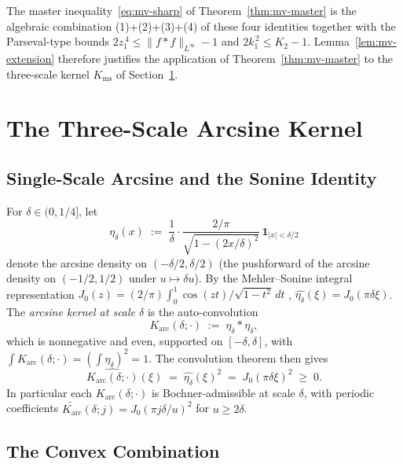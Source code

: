 \documentclass[11pt, letterpaper]{article}
\theoremstyle{paperplain}
\theoremstyle{paperdef}
\newcommand{\Linf}{L^\infty}
\newcommand{\Karc}{K_{\mathrm{arc}}}
\newcommand{\Kms}{K_{\mathrm{ms}}}
\begin{document}
The master inequality~\eqref{eq:mv-sharp} of
Theorem~\ref{thm:mv-master} is the algebraic combination
(1)+(2)+(3)+(4) of these four identities together with the
Parseval-type bounds $2z_1^{\,4}\le\|f*f\|_{\Linf}-1$ and
$2k_1^{\,2}\le K_2-1$.  Lemma~\ref{lem:mv-extension} therefore
justifies the application of Theorem~\ref{thm:mv-master} to the
three-scale kernel $\Kms$ of Section~\ref{sec:kernel}.

\section{The Three-Scale Arcsine Kernel}\label{sec:kernel}

\subsection{Single-Scale Arcsine and the Sonine Identity}\label{subsec:kernel-single}

For $\delta\in(0,1/4]$, let
\[
  \eta_\delta(x)
  \;:=\;
  \frac{1}{\delta}\cdot
  \frac{2/\pi}{\sqrt{1-(2x/\delta)^2}}\,
  \mathbf{1}_{|x|<\delta/2}
\]
denote the arcsine density on $(-\delta/2,\delta/2)$ (the
pushforward of the arcsine density on $(-1/2,1/2)$ under
$u\mapsto\delta u$).  By the Mehler--Sonine integral
representation $J_0(z)=(2/\pi)\int_0^1\!\cos(zt)/\sqrt{1-t^2}\,dt$
\cite[\S 10.9.4]{DLMF}, $\widehat{\eta_\delta}(\xi)=J_0(\pi\delta\xi)$.  The \emph{arcsine kernel at scale $\delta$} is the
auto-convolution
\[
  \Karc(\delta;\cdot)
  \;:=\;
  \eta_\delta*\eta_\delta,
\]
which is nonnegative and even, supported on $[-\delta,\delta]$, with
$\int\Karc(\delta;\cdot)=(\int\eta_\delta)^2=1$.  The convolution
theorem then gives
\begin{equation}\label{eq:sonine}
  \widehat{\Karc(\delta;\cdot)}(\xi)
  \;=\;
  \widehat{\eta_\delta}(\xi)^{2}
  \;=\; J_0(\pi\delta\xi)^2
  \;\ge\; 0.
\end{equation}
In particular each $\Karc(\delta;\cdot)$ is Bochner-admissible at
scale $\delta$, with periodic coefficients
$\widetilde{\Karc}(\delta;j)=J_0(\pi j\delta/u)^2$ for $u\ge 2\delta$.

\subsection{The Convex Combination}\label{subsec:kernel-combo}
\end{document}
